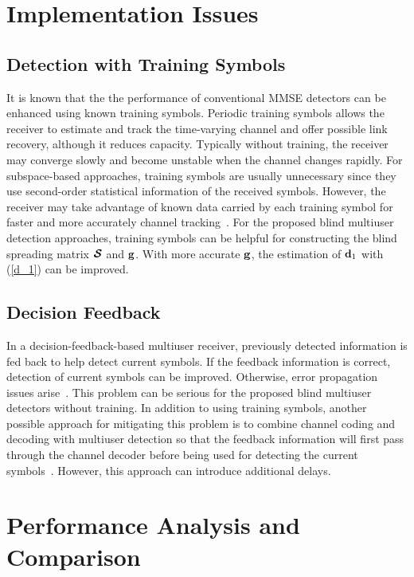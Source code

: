 \documentclass[conference]{IEEEtran}
\newcommand{\bg}{{\bf g}}
\newcommand{\bd}{{\bf d}}
\newcommand{\bcS}{{\mbox {\boldmath ${\cal S}$}}}
\begin{document}
\section{Implementation Issues}

\subsection{Detection with Training Symbols}
It is known that the the performance of conventional MMSE
detectors can be enhanced using known training symbols. Periodic
training symbols allows the receiver to estimate and track the
time-varying channel and offer possible link recovery, although it
reduces capacity.  Typically without training, the receiver may
converge slowly and become unstable when the channel changes rapidly.
For subspace-based approaches, training symbols are usually
unnecessary since they use second-order statistical information of
the received symbols. However, the receiver may take advantage of known
data carried by each training symbol for faster and more
accurately channel tracking~\cite{Madh98}. For the proposed blind
multiuser detection approaches, training symbols can be helpful
for constructing the blind spreading matrix $\bcS$ and $\bg$.  With
more accurate $\bg$, the estimation of $\bd_{1}$ with (\ref{d_1})
can be improved.

\subsection{Decision Feedback}

In a decision-feedback-based multiuser receiver, previously detected
information is fed back to help detect current symbols. If the feedback
information is correct, detection of current symbols can be improved.
Otherwise, error propagation issues arise~\cite{Verd98,Andr05}. This problem can be
serious for the proposed blind multiuser detectors without
training.  In addition to using training symbols, another possible
approach for mitigating this problem is to combine channel coding and
decoding with multiuser detection so that the feedback information
will first pass through the channel decoder before being used for
detecting the current symbols~\cite{Andr05}. However, this approach
can introduce additional delays.

\section{Performance Analysis and Comparison}
\end{document}
